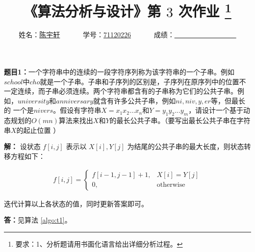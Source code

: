 \documentclass[12pt,a4paper]{ctexart}
\begin{document}

\title{
  {\heiti《算法分析与设计》第 {$3$} 次作业
    \footnote{要求：1、分析题请用书面化语言给出详细分析过程。}
    }
}
\date{}

\author{
姓名：\underline{陈宇轩}~~~~~~
学号：\underline{71120226}~~~~~~
成绩：\underline{~~~~~~~~~~~~~~~~~~}
}

\maketitle

\noindent
\section*{\bf \color{red}{算法分析题}}

\noindent
{\bf 题目1：}一个字符串中的连续的一段字符序列称为该字符串的一个子串。例如$school$中$cho$就是一个子串。子串和子序列的区别是，子序列在原序列中的位置不一定连续，而子串必须连续。两个字符串都含有的子串称为它们的公共子串。例如，$university$和$anniversary$就含有许多公共子串，例如$ni,niv,y,er$等，但最长的 一个是$nivers$。假设有字符串$X=x_1x_2...x_n$和$Y=y_1y_2...y_m$，请设计一个基于动态规划的$O(mn)$算法来找出$X$和$Y$的最长公共子串。（要写出最长公共子串在字符串$X$的起止位置 ）

\textbf{解：} 设状态 $f[i, j]$ 表示以 $X[i], Y[j]$ 为结尾的公共子串的最大长度，则状态转移方程如下：

\begin{align*}
  f[i, j] = \begin{cases}
    f[i - 1, j - 1] + 1, & X[i] = Y[j] \\
    0, & \text{otherwise}
  \end{cases}
\end{align*}

迭代计算以上各状态的值，同时更新答案即可。

\vspace{5pt}
\noindent
{\bf 答：}见算法 \ref{algo:t1}。
\end{document}
